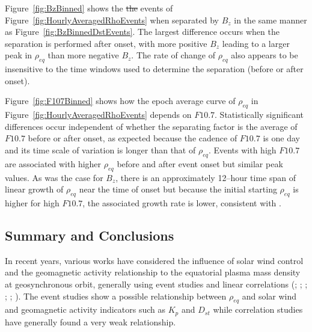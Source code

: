 \documentclass[12pt]{article}
\providecommand{\DIFdeltex}[1]{{\protect\color{red}\sout{#1}}}                      %
\providecommand{\DIFdelbegin}{} %
\providecommand{\DIFdelend}{} %
\providecommand{\DIFdel}[1]{\texorpdfstring{\DIFdeltex{#1}}{}} %
\begin{document}
Figure~\ref{fig:BzBinned} shows the \DIFdelbegin \DIFdel{the }\DIFdelend events of Figure~\ref{fig:HourlyAveragedRhoEvents} when separated by $B_z$ in the same manner as Figure~\ref{fig:BzBinnedDstEvents}.  The largest difference occurs when the separation is performed after onset, with more positive $B_z$ leading to a larger peak in $\rho_{eq}$ than more negative $B_{z}$.  The rate of change of $\rho_{eq}$ also appears to be insensitive to the time windows used to determine the separation (before or after onset).  


Figure~\ref{fig:F107Binned} shows how the epoch average curve of $\rho_{eq}$ in Figure~\ref{fig:HourlyAveragedRhoEvents} depends on $F10.7$.  Statistically significant differences occur independent of whether the separating factor is the average of $F10.7$ before or after onset, as expected because the cadence of $F10.7$ is one day and its time scale of variation is longer than that of $\rho_{eq}$.  Events with high $F10.7$ are associated with higher $\rho_{eq}$ before and after event onset but similar peak values.  As was the case for $B_z$, there is an approximately 12--hour time span of linear growth of $\rho_{eq}$ near the time of onset but because the initial starting $\rho_{eq}$ is higher for high $F10.7$, the associated growth rate is lower, consistent with \cite{Denton2016}.

\subsection{Summary and Conclusions}

In recent years, various works have considered the influence of solar wind control and the geomagnetic activity relationship to the equatorial plasma mass density at geosynchronous orbit, generally using event studies and linear correlations (\cite{Takahashi2006}; \cite{Denton2006}; \cite{Yao2008}; \cite{Takahashi2010}; \cite{Denton2011}; \cite{Denton2016}).  The event studies show a possible relationship between $\rho_{eq}$ and solar wind and geomagnetic activity indicators such as $K_p$ and $D_{st}$ while correlation studies have generally found a very weak relationship.
\end{document}
